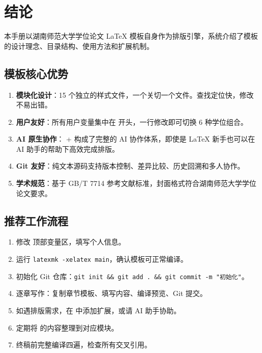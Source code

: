 \documentclass[../main-manual.tex]{subfiles}
\begin{document}
\cleardoublepage
\thispagestyle{empty}
 \songti
\setlength{\baselineskip}{24pt}
\RaggedRight
\setlength{\parindent}{2em}
\raggedbottom

\chapter{结论} \label{ch:conclusion}

本手册以湖南师范大学学位论文 \LaTeX{} 模板自身作为排版引擎，系统介绍了模板的设计理念、目录结构、使用方法和扩展机制。

\section{模板核心优势}

\begin{enumerate}[label=\textbf{(\arabic*)}]
	\item \textbf{模块化设计}：15 个独立的样式文件，一个关切一个文件。查找定位快，修改不易出错。
	\item \textbf{用户友好}：所有用户变量集中在  开头，一行修改即可切换 6 种学位组合。
	\item \textbf{AI 原生协作}： +  构成了完整的 AI 协作体系，即使是 \LaTeX{} 新手也可以在 AI 助手的帮助下高效完成排版。
	\item \textbf{Git 友好}：纯文本源码支持版本控制、差异比较、历史回溯和多人协作。
	\item \textbf{学术规范}：基于 GB/T 7714 参考文献标准，封面格式符合湖南师范大学学位论文要求。
\end{enumerate}

\section{推荐工作流程}

\begin{enumerate}[label=\textbf{第\arabic*步：}]
	\item 修改  顶部变量区，填写个人信息。
	\item 运行 \texttt{latexmk -xelatex main}，确认模板可正常编译。
	\item 初始化 Git 仓库：\texttt{git init \&\& git add . \&\& git commit -m "初始化"}。
	\item 逐章写作：复制章节模板、填写内容、编译预览、Git 提交。
	\item 如遇排版需求，在  中添加扩展，或请 AI 助手协助。
	\item 定期将  的内容整理到对应模块。
	\item 终稿前完整编译四遍，检查所有交叉引用。
\end{enumerate}
\end{document}
